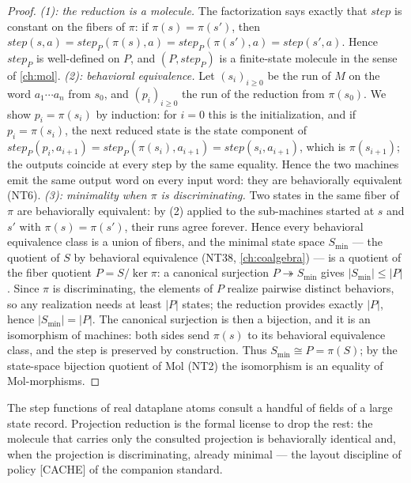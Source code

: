 \begin{proof}
\emph{(1): the reduction is a molecule.} The factorization says exactly that
$\mathit{step}$ is constant on the fibers of $\pi$: if $\pi(s) = \pi(s')$,
then $\mathit{step}(s, a) = \mathit{step}_{P}(\pi(s), a) =
\mathit{step}_{P}(\pi(s'), a) = \mathit{step}(s', a)$. Hence
$\mathit{step}_{P}$ is well-defined on $P$, and $(P, \mathit{step}_{P})$ is a
finite-state molecule in the sense of \autoref{ch:mol}.
\emph{(2): behavioral equivalence.} Let $(s_i)_{i \ge 0}$ be the run of $M$
on the word $a_1 \cdots a_n$ from $s_0$, and $(p_i)_{i \ge 0}$ the run of the
reduction from $\pi(s_0)$. We show $p_i = \pi(s_i)$ by induction: for $i = 0$
this is the initialization, and if $p_i = \pi(s_i)$, the next reduced state is
the state component of
$\mathit{step}_{P}(p_i, a_{i+1}) = \mathit{step}_{P}(\pi(s_i), a_{i+1}) =
\mathit{step}(s_i, a_{i+1})$, which is $\pi(s_{i+1})$; the outputs coincide at
every step by the same equality. Hence the two machines emit the same output
word on every input word: they are behaviorally equivalent (NT6).
\emph{(3): minimality when $\pi$ is discriminating.} Two states in the same
fiber of $\pi$ are behaviorally equivalent: by (2) applied to the sub-machines
started at $s$ and $s'$ with $\pi(s) = \pi(s')$, their runs agree forever.
Hence every behavioral equivalence class is a union of fibers, and the minimal
state space $S_{\min}$ --- the quotient of $S$ by behavioral equivalence
(NT38, \autoref{ch:coalgebra}) --- is a quotient of the fiber quotient
$P = S / \ker \pi$: a canonical surjection $P \twoheadrightarrow S_{\min}$
gives $|S_{\min}| \le |P|$. Since $\pi$ is discriminating, the elements of
$P$ realize pairwise distinct behaviors, so any realization needs at least
$|P|$ states; the reduction provides exactly $|P|$, hence $|S_{\min}| =
|P|$. The canonical surjection is then a bijection, and it is an isomorphism
of machines: both sides send $\pi(s)$ to its behavioral equivalence class, and
the step is preserved by construction. Thus $S_{\min} \cong P = \pi(S)$; by
the state-space bijection quotient of Mol (NT2) the isomorphism is an equality
of Mol-morphisms.
\end{proof}

\begin{remark}
The step functions of real dataplane atoms consult a handful of fields of a
large state record. Projection reduction is the formal license to drop the
rest: the molecule that carries only the consulted projection is
behaviorally identical and, when the projection is discriminating, already
minimal --- the layout discipline of policy [CACHE] of the companion standard.
\end{remark}

